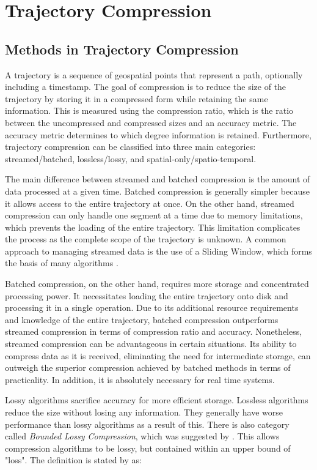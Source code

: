 \section{Trajectory Compression}
\label{sec:traj}
\subsection{Methods in Trajectory Compression}
A trajectory is a sequence of geospatial points that represent a path, optionally including a timestamp. The goal of compression is to reduce the size of the trajectory by storing it in a compressed form while retaining the same information. This is measured using the compression ratio, which is the ratio between the uncompressed and compressed sizes and an accuracy metric. The accuracy metric determines to which degree information is retained. Furthermore, trajectory compression can be classified into three main categories: streamed/batched, lossless/lossy, and spatial-only/spatio-temporal.

The main difference between streamed and batched compression is the amount of data processed at a given time. Batched compression is generally simpler because it allows access to the entire trajectory at once. On the other hand, streamed compression can only handle one segment at a time due to memory limitations, which prevents the loading of the entire trajectory. This limitation complicates the process as the complete scope of the trajectory is unknown. A common approach to managing streamed data is the use of a Sliding Window, which forms the basis of many algorithms \cite{Sun2016}.

Batched compression, on the other hand, requires more storage and concentrated processing power. It necessitates loading the entire trajectory onto disk and processing it in a single operation. Due to its additional resource requirements and knowledge of the entire trajectory, batched compression outperforms streamed compression in terms of compression ratio and accuracy. Nonetheless, streamed compression can be advantageous in certain situations. Its ability to compress data as it is received, eliminating the need for intermediate storage, can outweigh the superior compression achieved by batched methods in terms of practicality. In addition, it is absolutely necessary for real time systems.

Lossy algorithms sacrifice accuracy for more efficient storage. Lossless algorithms reduce the size without losing any information. They generally have worse performance than lossy algorithms as a result of this. There is also category called \textit{Bounded Lossy Compression}, which was suggested by \textcite{zhao2018rest}. This allows compression algorithms to be lossy, but contained within an upper bound of "loss". The definition is stated by \textcite{zhao2018rest} as:

